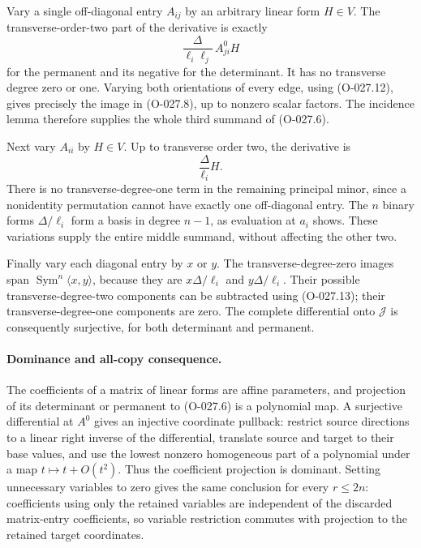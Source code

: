 Vary a single off-diagonal entry \(A_{ij}\) by an arbitrary
linear form \(H\in V\). The transverse-order-two part of the
derivative is exactly
\[
              \frac{\Delta}{\ell_i\ell_j}\,A^0_{ji}H
                                                               \tag{O-027.13}
\]
for the permanent and its negative for the determinant.
It has no transverse degree zero or one. Varying both
orientations of every edge, using (O-027.12), gives precisely
the image in (O-027.8), up to nonzero scalar factors.
The incidence lemma therefore supplies the whole third
summand of (O-027.6).

Next vary \(A_{ii}\) by \(H\in V\). Up to transverse order two,
the derivative is
\[
                         \frac{\Delta}{\ell_i}H.
                                                               \tag{O-027.14}
\]
There is no transverse-degree-one term in the remaining
principal minor, since a nonidentity permutation cannot have
exactly one off-diagonal entry. The \(n\) binary forms
\(\Delta/\ell_i\) form a basis in degree \(n-1\), as evaluation
at \(a_i\) shows. These variations supply the entire middle
summand, without affecting the other two.

Finally vary each diagonal entry by \(x\) or \(y\).
The transverse-degree-zero images span
\(\operatorname{Sym}^n\langle x,y\rangle\), because they are
\(x\Delta/\ell_i\) and \(y\Delta/\ell_i\).
Their possible transverse-degree-two components can be
subtracted using (O-027.13); their transverse-degree-one
components are zero. The complete differential onto
\(\mathcal J\) is consequently surjective, for both determinant
and permanent.

\paragraph{Dominance and all-copy consequence.}
The coefficients of a matrix of linear forms are affine
parameters, and projection of its determinant or permanent
to (O-027.6) is a polynomial map.
A surjective differential at \(A^0\) gives an injective
coordinate pullback: restrict source directions to a linear
right inverse of the differential, translate source and
target to their base values, and use the lowest nonzero
homogeneous part of a polynomial under a map
\(t\mapsto t+O(t^2)\).
Thus the coefficient projection is dominant.
Setting unnecessary variables to zero gives the same
conclusion for every \(r\leq2n\): coefficients using only
the retained variables are independent of the discarded
matrix-entry coefficients, so variable restriction commutes
with projection to the retained target coordinates.

